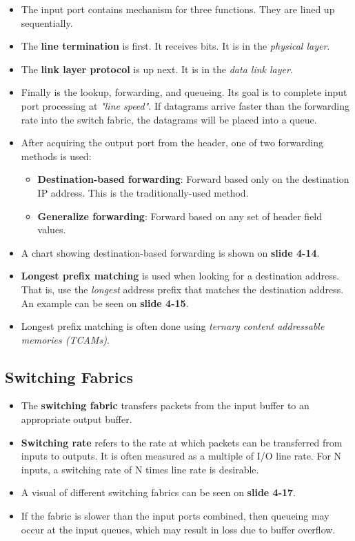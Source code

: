 \documentclass{article}
\begin{document}
\begin{itemize}
\item The input port contains mechanism for three functions. They are lined up sequentially.
\item The {\bf line termination} is first. It receives bits. It is in the \emph{physical layer}.
\item The {\bf link layer protocol} is up next. It is in the \emph{data link layer}.
\item Finally is the lookup, forwarding, and queueing. Its goal is to complete input port processing at \emph{"line speed"}. If datagrams arrive faster than the forwarding rate into the switch fabric, the datagrams will be placed into a queue.
\item After acquiring the output port from the header, one of two forwarding methods is used:
\begin{itemize}
\item {\bf Destination-based forwarding}: Forward based only on the destination IP address. This is the traditionally-used method.
\item {\bf Generalize forwarding}: Forward based on any set of header field values.
\end{itemize}
\item A chart showing destination-based forwarding is shown on {\bf slide 4-14}.
\item {\bf Longest prefix matching} is used when looking for a destination address. That is, use the \emph{longest} address prefix that matches the destination address. An example can be seen on {\bf slide 4-15}.
\item Longest prefix matching is often done using \emph{ternary content addressable memories (TCAMs)}.
\end{itemize}

\subsection{Switching Fabrics}

\begin{itemize}
\item The {\bf switching fabric} transfers packets from the input buffer to an appropriate output buffer.
\item {\bf Switching rate} refers to the rate at which packets can be transferred from inputs to outputs. It is often measured as a multiple of I/O line rate. For N inputs, a switching rate of N times line rate is desirable.
\item A visual of different switching fabrics can be seen on {\bf slide 4-17}.
\item If the fabric is slower than the input ports combined, then queueing may occur at the input queues, which may result in loss due to buffer overflow.
\end{itemize}
\end{document}
